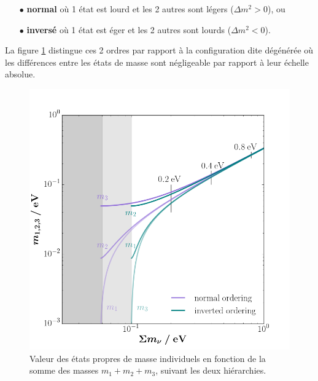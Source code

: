 \begin{itemize}
\item[$\bullet$] \textbf{normal} où 1 état est lourd et les 2 autres sont légers ($\Delta m^2 > 0$), ou \\
\item[$\bullet$] \textbf{inversé} où 1 état est éger et les 2 autres sont lourds ($\Delta m^2 < 0$). \\
\end{itemize} La figure \ref{fig:hierachy} distingue ces 2 ordres par rapport à la configuration dite dégénérée où les différences entre les états de masse sont négligeable par rapport à leur échelle absolue. \\

\begin{figure}
\begin{center}
\includegraphics[width=0.75\columnwidth]{Figures/Smnu_mnu.png}
\caption{Valeur des états propres de masse individuels en fonction de la somme des masses $m_1+m_2+m_3$, suivant les deux hiérarchies.}
\label{fig:hierachy}
\end{center}
\end{figure}

